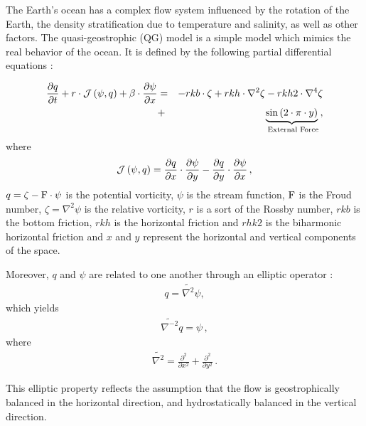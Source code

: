 \documentclass[12pt]{article}
\begin{document}
The Earth's ocean has a complex flow system influenced by the rotation of the Earth, the density stratification due to temperature and salinity, as well as other factors. The quasi-geostrophic (QG) model is a simple model which mimics the real behavior of the ocean. 
It is defined by the following partial differential equations \cite{Carton94}:

\label{Results:QG-Model}
\begin{eqnarray}
\label{QGModel:model} \nonumber
\displaystyle \frac{\partial q}{\partial t}+r \cdot {\mathcal{J}} \left ( {\bf \psi} , q\right ) + \beta \cdot \frac{\partial \psi}{\partial x} &=&  -rkb \cdot \zeta + rkh \cdot \nabla^2 \zeta - rkh2 \cdot \nabla^4 \zeta \\ 
&+& \underbrace{\sin \left( 2 \cdot \pi \cdot y\right )}_{ \text{ External Force}} \, ,
\end{eqnarray}
where 
\begin{eqnarray} 
\displaystyle {\mathcal{J}} \left ( {\bf \psi} , q\right ) = \frac{\partial q}{\partial x} \cdot \frac{\partial \psi}{\partial y}-\frac{\partial q}{\partial y} \cdot \frac{\partial \psi}{\partial x} \, ,
\end{eqnarray}
$q = \zeta - {\rm F} \cdot \psi$ is the potential vorticity, $\psi$ is the stream function, ${\rm F}$ is the Froud number, $\zeta = \nabla^2 \psi$ is the relative vorticity, $r$ is a sort of the Rossby number, $rkb$ is the bottom friction, $rkh$ is the horizontal friction and $rhk2$ is the biharmonic horizontal friction and $x$ and $y$ represent the horizontal and vertical components of the space.

Moreover, $q$ and ${\psi}$ are related to one another through an elliptic operator \cite{Pedl96}:
\begin{eqnarray}
\label{QGModel:relation-vorticity-stream}
\displaystyle q = \tilde{\nabla^2} \psi,
\end{eqnarray}
which yields 
\begin{eqnarray}
\label{QGModel:inversion-vorticity}
\displaystyle  \tilde{\nabla^{-2}} q = \psi\, ,
\end{eqnarray}
where 
\begin{eqnarray*} 
\tilde{\nabla^{2}} = \frac{\partial^2}{\partial x^2}+\frac{\partial^2}{\partial y^2} \,.
\end{eqnarray*}

This elliptic property reflects the assumption that the flow is geostrophically balanced in the horizontal direction, and hydrostatically balanced in the vertical direction.
\end{document}
